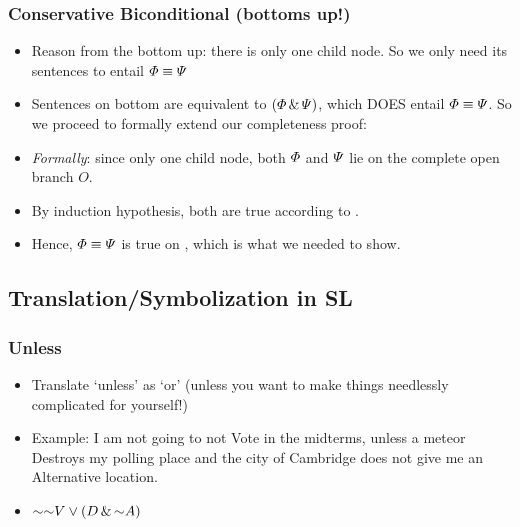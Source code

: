 \begin{frame}
\frametitle{Conservative Biconditional (bottoms up!)}

\begin{itemize}[<+->]

\item Reason from the bottom up: there is only one child node. So we only need its sentences to entail $\varPhi{}\equiv\varPsi{}$

\item Sentences on bottom are equivalent to $(\varPhi{} \,\&\, \varPsi{})$, which DOES entail $\varPhi{}\equiv\varPsi{}$. So we proceed to formally extend our completeness proof: 

\bigskip 

\bi 

\item \emph{Formally}: since only one child node, both $\varPhi{}$ and $\varPsi{}$ lie on the complete open branch $O$. 

\item By induction hypothesis, both are true according to . 

\item Hence, $\varPhi{}\equiv\varPsi{}$ is true on , which is what we needed to show. 

\ei 


\end{itemize}
\end{frame}



\subsection{Translation/Symbolization in SL}

\begin{frame}
\frametitle{Unless}

\begin{itemize}[<+->]

\item Translate `unless' as `or' (unless you want to make things needlessly complicated for yourself!)

\item Example: I am not going to not Vote in the midterms, unless a meteor Destroys my polling place and the city of Cambridge does not give me an Alternative location.

\item $\enot \enot V \eor (D \eand \enot A)$

\end{itemize}
\end{frame}


